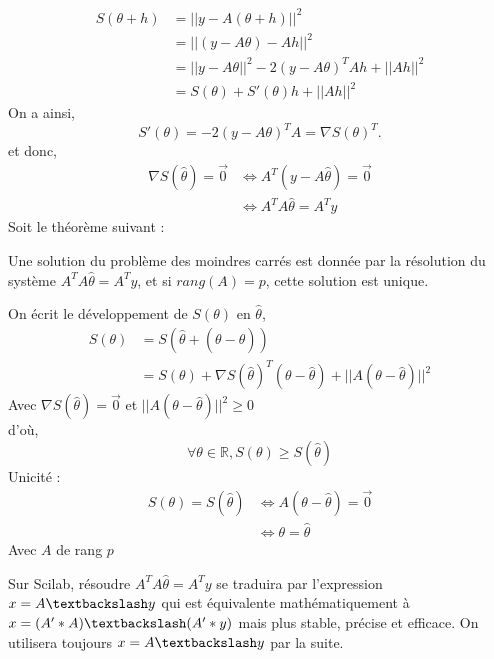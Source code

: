         \begin{align*}
         S(\theta + h) &= ||y-A(\theta + h)||^2\\
         &=||(y-A\theta)-A h||^2\\
         &=||y-A\theta||^2-2(y-A\theta)^T A h+||A h||^2\\
         &=S(\theta)+S'(\theta)h+||A h||^2
         \end{align*}
         On a ainsi,
         $$S'(\theta) = -2(y-A\theta)^T A = \nabla S(\theta)^T.$$
         et donc,
         \begin{align*}
         \nabla S(\hat{\theta}) = \Vec{0} &\Leftrightarrow A^T(y-A\hat{\theta}) = \Vec{0}\\
         &\Leftrightarrow A^T A \hat{\theta} = A^T y
         \end{align*}
         \newpage
         Soit le théorème suivant :
         \begin{theoreme}
             Une solution du problème des moindres carrés est donnée par la résolution du système $A^T A\hat{\theta}=A^T y$, et si $rang(A) = p$, cette solution est unique.
         \end{theoreme}
        \begin{preuve}
        On écrit le développement de $S(\theta)$ en $\hat{\theta}$,
         \begin{align*}
             S(\theta) &= S(\hat{\theta}+(\theta - \hat{\theta}))\\
             &=S(\theta)+\nabla S(\hat{\theta})^T(\theta-\hat{\theta})+||A(\theta - \hat{\theta})||^2
         \end{align*}
         Avec $\nabla S(\hat{\theta}) = \Vec{0} $ et $ ||A(\theta - \hat{\theta})||^2\geq0$ \\d'où,
         $$\forall \theta \in \mathbb{R}, S(\theta) \geq S(\hat{\theta})$$
        Unicité : 
        \begin{align*}
            S(\theta) = S(\hat{\theta})&\Leftrightarrow A(\theta-\hat{\theta}) = \Vec{0}\\
            &\Leftrightarrow \theta = \hat{\theta}
        \end{align*}
        Avec $A$ de rang $p$
        \end{preuve}
        Sur Scilab, résoudre $A^T A\hat{\theta}=A^T y$  se traduira par l'expression $x=A\textbackslash y$ qui est équivalente mathématiquement à $x=(A'*A)\textbackslash (A'*y)$ mais plus stable, précise et efficace. On utilisera toujours $x=A\textbackslash y$ par la suite.
